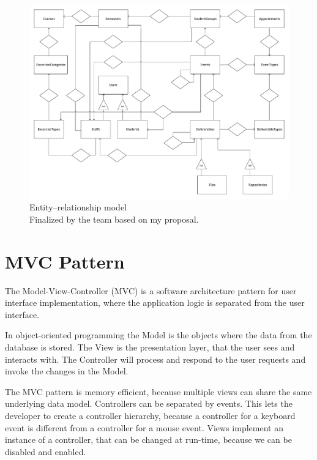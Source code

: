 \begin{figure}[!htbp]
	\includegraphics[width=0.85\textheight, angle=90]{figures/ER.pdf}
	\caption[Entity–relationship model]{Entity–relationship model\\Finalized by the team based on my proposal.}
	\label{fig:er}
\end{figure}


\newpage
\section{MVC Pattern}
\label{mvc}

The Model-View-Controller (MVC) is a software architecture pattern for user interface implementation, where the application logic is separated from the user interface.

In object-oriented programming the Model is the objects where the data from the database is stored. The View is the presentation layer, that the user sees and interacts with. The Controller will process and respond to the user requests and invoke the changes in the Model. 

The MVC pattern is memory efficient, because multiple views can share the same underlying data model. Controllers can be separated by events. This lets the developer to create a controller hierarchy, because a controller for a keyboard event is different from a controller for a mouse event. Views implement an instance of a controller, that can be changed at run-time, because we can be disabled and enabled.


